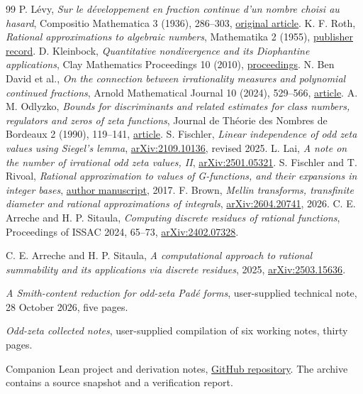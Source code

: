 \documentclass[11pt]{article}
\theoremstyle{remark}
\begin{document}




\begin{thebibliography}{99}
P. L\'evy, \emph{Sur le d\'eveloppement en fraction continue d'un nombre choisi au hasard},
Compositio Mathematica 3 (1936), 286--303,
\href{https://www.numdam.org/item/CM_1936__3__286_0/}{original article}.
K. F. Roth, \emph{Rational approximations to algebraic numbers},
Mathematika 2 (1955),
\href{https://www.cambridge.org/core/journals/mathematika/article/rational-approximations-to-algebraic-numbers/EFB89E2873019B246F004FAA06E05A7F}{publisher record}.
D. Kleinbock, \emph{Quantitative nondivergence and its Diophantine applications},
Clay Mathematics Proceedings 10 (2010),
\href{https://www.claymath.org/library/proceedings/cmip010c.pdf}{proceedings}.
N. Ben David et al., \emph{On the connection between irrationality measures and polynomial continued fractions},
Arnold Mathematical Journal 10 (2024), 529--566,
\href{https://doi.org/10.1007/s40598-024-00250-z}{article}.
A. M. Odlyzko, \emph{Bounds for discriminants and related estimates for class numbers, regulators and zeros of zeta functions},
Journal de Th\'eorie des Nombres de Bordeaux 2 (1990), 119--141,
\href{https://www.numdam.org/item/JTNB_1990__2_1_119_0.pdf}{article}.
S. Fischler, \emph{Linear independence of odd zeta values using Siegel's lemma},
\href{https://arxiv.org/abs/2109.10136}{arXiv:2109.10136}, revised 2025.
L. Lai, \emph{A note on the number of irrational odd zeta values, II},
\href{https://arxiv.org/abs/2501.05321}{arXiv:2501.05321}.
S. Fischler and T. Rivoal, \emph{Rational approximation to values of G-functions, and their expansions in integer bases},
\href{https://www.imo.universite-paris-saclay.fr/~stephane.fischler/approxG.pdf}{author manuscript}, 2017.
F. Brown, \emph{Mellin transforms, transfinite diameter and rational approximations of integrals},
\href{https://arxiv.org/abs/2604.20741}{arXiv:2604.20741}, 2026.
C. E. Arreche and H. P. Sitaula,
\emph{Computing discrete residues of rational functions},
Proceedings of ISSAC 2024, 65--73,
\href{https://arxiv.org/abs/2402.07328}{arXiv:2402.07328}.

C. E. Arreche and H. P. Sitaula,
\emph{A computational approach to rational summability and its
applications via discrete residues}, 2025,
\href{https://arxiv.org/abs/2503.15636}{arXiv:2503.15636}.

\emph{A Smith-content reduction for odd-zeta Pad\'e forms},
user-supplied technical note, 28 October 2026, five pages.

\emph{Odd-zeta collected notes},
user-supplied compilation of six working notes, thirty pages.

Companion Lean project and derivation notes,
\href{https://github.com/ranbirsurii/irrationality-perhaps-}{GitHub repository}.
The archive contains a source snapshot and a verification report.
\end{thebibliography}
\end{document}
